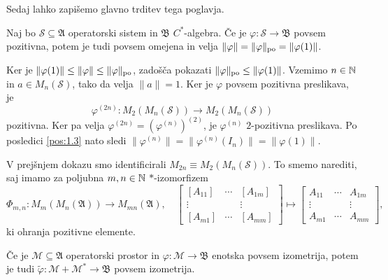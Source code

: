 Sedaj lahko zapišemo glavno trditev tega poglavja.

\begin{trditev}
    Naj bo $\mathcal{S} \subseteq \mathfrak{A}$ operatorski sistem in $\mathfrak{B}$ $C^*$-algebra.
    Če je $\varphi: \mathcal{S} \to \mathfrak{B}$ povsem pozitivna, potem je tudi povsem omejena in velja
    $\| \varphi \| = \| \varphi \|_{\operatorname{po}} = \| \varphi (1)\|$.
\end{trditev}

\begin{dokaz}
    Ker je $\| \varphi (1) \| \leq \| \varphi\| \leq \| \varphi\|_{\operatorname{po}}$, zadošča pokazati
    $\| \varphi\|_{\operatorname{po}} \leq \| \varphi(1)\|$. 
    Vzemimo $n \in \mathbb N$ in $a \in M_n (\mathcal{S})$,
    tako da velja $\| a\| = 1$. Ker je $\varphi$ povsem pozitivna preslikava, je
    $$ \varphi^{(2n)} : M_2 (M_n (\mathcal{S})) \to M_2 (M_n (\mathcal{S}))$$
    pozitivna. 
    Ker pa velja $ \varphi^{(2n)} = (\varphi^{(n)})^{(2)}$, je $\varphi^{(n)}$ $2$-pozitivna preslikava.
    Po posledici \ref{pos:1.3} nato sledi $\| \varphi^{(n)}\| = \| \varphi^{(n)} (I_n)\| = \| \varphi (1)\|$.
\end{dokaz}

\begin{opomba}
    V prejšnjem dokazu smo identificirali $M_{2n} \equiv M_2 (M_n(\mathcal{S}))$.
    To smemo narediti, saj imamo za poljubna $m, n \in \mathbb N$ $*$-izomorfizem
    $$\Phi_{m, n} : M_m (M_n (\mathfrak{A})) \to M_{mn} (\mathfrak{A}),\quad \begin{bmatrix}
        [A_{11}] & \cdots & [A_{1m}]\\
        \vdots & & \vdots\\
        [A_{m1}] & \cdots & [A_{mm}]
    \end{bmatrix} \mapsto \begin{bmatrix}
        A_{11} & \cdots & A_{1m}\\
        \vdots & & \vdots\\
        A_{m1} & \cdots & A_{mm}
    \end{bmatrix},$$
    ki ohranja pozitivne elemente. 
\end{opomba}

\begin{posledica}
    Če je $\mathcal{M} \subseteq \mathfrak{A}$ operatorski prostor in $\varphi: \mathcal{M} \to \mathfrak{B}$
    enotska povsem izometrija, potem je tudi $\tilde{\varphi}: \mathcal{M} + \mathcal{M}^* \to \mathfrak{B}$
    povsem izometrija.
\end{posledica}

